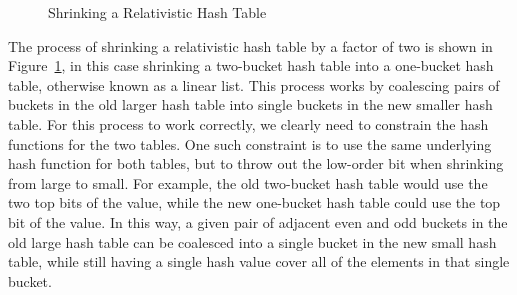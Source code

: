 \begin{figure}[tb]
\centering
{}
\caption{Shrinking a Relativistic Hash Table}
\label{fig:datastruct:Shrinking a Relativistic Hash Table}
\end{figure}

The process of shrinking a relativistic hash table by a factor of two
is shown in
Figure~\ref{fig:datastruct:Shrinking a Relativistic Hash Table},
in this case shrinking a two-bucket hash table into a one-bucket
hash table, otherwise known as a linear list.
This process works by coalescing pairs of buckets in the old larger hash
table into single buckets in the new smaller hash table.
For this process to work correctly, we clearly need to constrain the hash
functions for the two tables.
One such constraint is to use the same underlying hash function for
both tables, but to throw out the low-order bit when shrinking from
large to small.
For example, the old two-bucket hash table would
use the two top bits of the value, while the new one-bucket hash table
could use the top bit of the value.
In this way, a given pair of adjacent even and odd buckets in the old
large hash table can be coalesced into a single bucket in the new small
hash table, while still having a single hash value cover all of the
elements in that single bucket.

